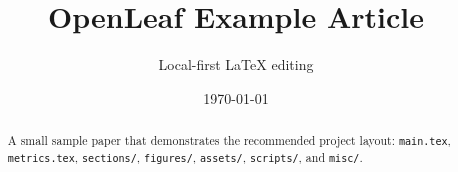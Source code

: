 \documentclass[11pt,a4paper]{article}
\title{OpenLeaf Example Article}
\author{Local-first \LaTeX{} editing}
\date{\today}
\begin{document}


\maketitle

\begin{abstract}
A small sample paper that demonstrates the recommended project layout:
\texttt{main.tex}, \texttt{metrics.tex}, \texttt{sections/}, \texttt{figures/},
\texttt{assets/}, \texttt{scripts/}, and \texttt{misc/}.
\end{abstract}

\tableofcontents
\newpage








\end{document}
